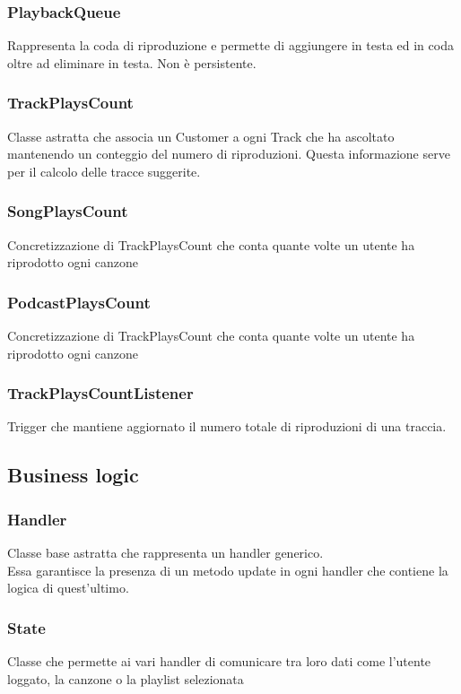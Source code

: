\documentclass{article}
\begin{document}
  \subsubsection{PlaybackQueue}
  Rappresenta la coda di riproduzione e permette di aggiungere in testa ed in coda oltre ad eliminare in testa. Non è persistente.

  \subsubsection{TrackPlaysCount}
  Classe astratta che associa un Customer a ogni Track che ha ascoltato mantenendo un conteggio del numero di riproduzioni. Questa informazione serve per il calcolo delle tracce suggerite.

  \subsubsection{SongPlaysCount}
  Concretizzazione di TrackPlaysCount che conta quante volte un utente ha riprodotto ogni canzone

  \subsubsection{PodcastPlaysCount}
  Concretizzazione di TrackPlaysCount che conta quante volte un utente ha riprodotto ogni canzone

  \subsubsection{TrackPlaysCountListener}
  Trigger che mantiene aggiornato il numero totale di riproduzioni di una traccia.

  \subsection{Business logic}

  \subsubsection{Handler}
  Classe base astratta che rappresenta un handler generico.\\
  Essa garantisce la presenza di un metodo update in ogni handler che contiene la logica di quest'ultimo.
  \subsubsection{State}
  Classe che permette ai vari handler di comunicare tra loro dati come
  l'utente loggato, la canzone o la playlist selezionata
\end{document}
